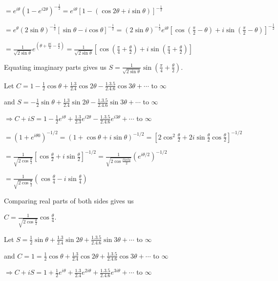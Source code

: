   $= e^{i\theta}\left(1 - e^{i2\theta}\right)^{-\frac{1}{2}} = e^{i\theta}[1 - (\cos2\theta +
    i\sin\theta)]^{-\frac{1}{2}}$

  $= e^{\theta}(2\sin\theta)^{-\frac{1}{2}}[\sin\theta - i\cos\theta]^{-\frac{1}{2}} =
  (2\sin\theta)^{-\frac{1}{2}}e^{i\theta}\left[\cos\left(\frac{\pi}{2} - \theta\right) +
    i\sin\left(\frac{\pi}{2} - \theta\right)\right]^{-\frac{1}{2}}$

  $= \frac{1}{\sqrt{2\sin\theta}}e^{\left(\theta + \frac{pi}{4} - \frac{\theta}{2}\right)} =
  \frac{1}{\sqrt{2\sin\theta}}\left[\cos\left(\frac{\pi}{4} + \frac{\theta}{2}\right) +
    i\sin\left(\frac{\pi}{4} + \frac{\theta}{2}\right)\right]$

  Equating imaginary parts gives us $S = \frac{1}{\sqrt{2\sin\theta}}\sin\left(\frac{\pi}{4} +
  \frac{\theta}{2}\right)$.
\item Let $C = 1 - \frac{1}{2}\cos\theta + \frac{1.3}{2.4}\cos2\theta - \frac{1.3.5}{2.4.6}\cos3\theta +
  \cdots$ to $\infty$

  and $S = - \frac{1}{2}\sin\theta + \frac{1.3}{2.4}\sin2\theta - \frac{1.3.5}{2.4.6}\sin3\theta + \cdots$
  to $\infty$

  $\Rightarrow C + iS = 1 - \frac{1}{2}e^{i\theta} + \frac{1.3}{2.3}e^{i2\theta} -
  \frac{1.3.5}{2.4.6}e^{i3\theta} + \cdots$ to $\infty$

  $= \left(1 + e^{i\theta0}\right)^{-1/2} = (1 + \cos\theta + i\sin\theta)^{-1/2} =
  \left[2\cos^2\frac{\theta}{2} + 2i\sin\frac{\theta}{2}\cos\frac{\theta}{2}\right]^{-1/2}$

  $= \frac{1}{\sqrt{2\cos\frac{\theta}{2}}}\left[\cos\frac{\theta}{2} + i\sin\frac{\theta}{2}\right]^{-1/2}
  = \frac{1}{\sqrt{2\cos\frac{theta}{2}}}\left(e^{i\theta/2}\right)^{-1/2}$

  $= \frac{1}{\sqrt{2\cos\frac{\theta}{2}}}\left(\cos\frac{\theta}{4} - i\sin\frac{\theta}{4}\right)$

  Comparing real parts of both sides gives us

  $C = \frac{1}{\sqrt{2\cos\frac{\theta}{2}}}\cos\frac{\theta}{4}$.
\item Let $S = \frac{1}{2}\sin\theta + \frac{1.3}{2.4}\sin2\theta + \frac{1.3.5}{2.4.6}\sin3\theta + \cdots$
  to $\infty$

  and $C = 1 = \frac{1}{2}\cos\theta + \frac{1.3}{2.4}\cos2\theta + \frac{1.3.5}{2.4.6}\cos3\theta + \cdots$
  to $\infty$

  $\Rightarrow C + iS = 1 + \frac{1}{2}e^{i\theta} + \frac{1.3}{2.4}e^{2i\theta} +
  \frac{1.3.5}{2.4.6}e^{3i\theta} + \cdots$ to $\infty$

